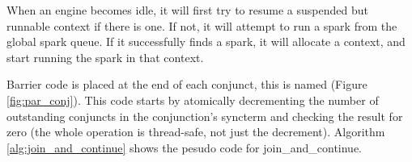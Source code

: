 When an engine becomes idle, it will first try
to resume a suspended but runnable context if there is one.
If not, it will attempt to run a spark from the global spark queue.
If it successfully finds a spark, it will allocate a context,
and start running the spark in that context.


Barrier code is placed at the end of each conjunct,
this is named  (Figure \ref{fig:par_conj}).
This code starts by atomically decrementing the number of outstanding
conjuncts in the conjunction's syncterm and checking the result for zero
(the whole operation is thread-safe, not just the decrement).
Algorithm \ref{alg:join_and_continue} shows the pesudo code for
join\_and\_continue.

